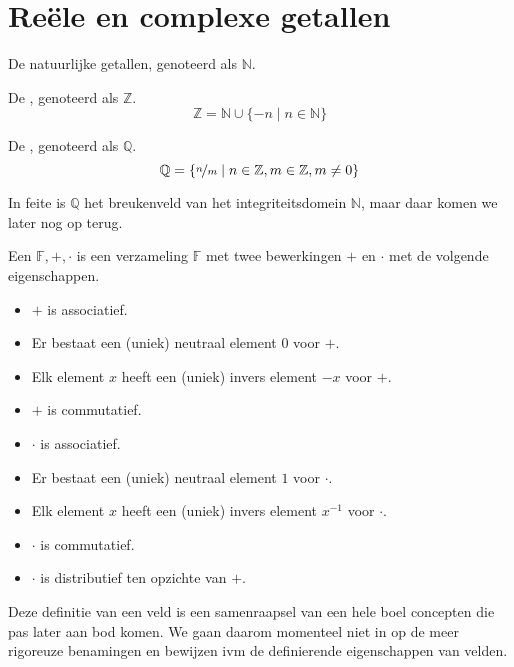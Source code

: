 \documentclass[main.tex]{subfiles}
\begin{document}
\chapter{Re\"ele en complexe getallen}
\label{cha:reele-en-complexe-getallen}


\begin{de}
  De natuurlijke getallen, genoteerd als $\mathbb{N}$.
\end{de}

\begin{de}
  De , genoteerd als $\mathbb{Z}$.
  \[ \mathbb{Z} = \mathbb{N} \cup \{ -n \mid n\in \mathbb{N} \}  \]
\end{de}

\begin{de}
  De , genoteerd als $\mathbb{Q}$.
  \[ \mathbb{Q} = \{ \nicefrac{n}{m} \mid n\in \mathbb{Z}, m\in \mathbb{Z}, m \neq 0 \} \]
\end{de}

\begin{opm}
  In feite is $\mathbb{Q}$ het breukenveld van het integriteitsdomein $\mathbb{N}$, maar daar komen we later nog op terug.   
\end{opm}

\begin{de}
  Een  $\mathbb{F},+,\cdot$ is een verzameling $\mathbb{F}$ met twee bewerkingen $+$ en $\cdot$ met de volgende eigenschappen.
  \begin{itemize}
  \item $+$ is associatief.
  \item Er bestaat een (uniek) neutraal element $0$ voor $+$.
  \item Elk element $x$ heeft een (uniek) invers element $-x$ voor $+$.
  \item $+$ is commutatief.
  \item $\cdot$ is associatief.
  \item Er bestaat een (uniek) neutraal element $1$ voor $\cdot$.
  \item Elk element $x$ heeft een (uniek) invers element $x^{-1}$ voor $\cdot$.
  \item $\cdot$ is commutatief.
  \item $\cdot$ is distributief ten opzichte van $+$.
  \end{itemize}
\end{de}

\begin{opm}
  Deze definitie van een veld is een samenraapsel van een hele boel concepten die pas later aan bod komen.
  We gaan daarom momenteel niet in op de meer rigoreuze benamingen en bewijzen ivm de definierende eigenschappen van velden.
\end{opm}
\end{document}
